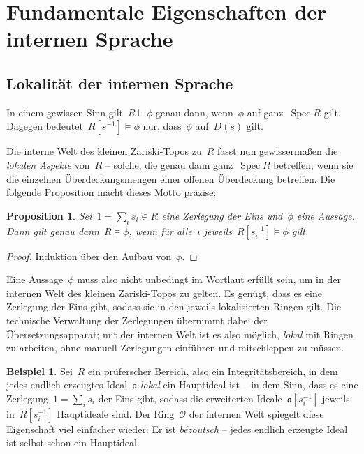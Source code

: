 \documentclass[a4paper,ngerman,12pt]{scrartcl}
\theoremstyle{definition}
\newtheorem{bsp}[defn]{Beispiel}
\theoremstyle{plain}
\newtheorem{prop}[defn]{Proposition}
\theoremstyle{remark}
\renewcommand{\aa}{\mathfrak{a}}
\renewcommand{\O}{\mathcal{O}}
\DeclareMathOperator{\Spec}{Spec}
\renewcommand{\_}{\mathpunct{.}\,}
\newcommand{\?}{\,{:}\,}
\begin{document}
\section{Fundamentale Eigenschaften der internen Sprache}

\subsection{Lokalität der internen Sprache}

In einem gewissen Sinn gilt~$R \models \phi$ genau dann, wenn~$\phi$ auf ganz~$\Spec R$
gilt. Dagegen bedeutet~$R[s^{-1}] \models \phi$ nur, dass~$\phi$ auf~$D(s)$
gilt.

Die interne Welt des kleinen Zariski-Topos zu~$R$ fasst nun gewissermaßen die
\emph{lokalen Aspekte} von~$R$ -- solche, die genau dann ganz~$\Spec R$
betreffen, wenn sie die einzelnen Überdeckungsmengen einer offenen
Überdeckung betreffen. Die folgende Proposition macht dieses Motto präzise:
\begin{prop}Sei~$1 = \sum_i s_i \in R$ eine Zerlegung der Eins und~$\phi$ eine
Aussage. Dann gilt genau dann~$R \models \phi$, wenn für alle~$i$
jeweils~$R[s_i^{-1}] \models \phi$ gilt.\end{prop}
\begin{proof}Induktion über den Aufbau von~$\phi$.\end{proof}

Eine Aussage~$\phi$ muss also nicht unbedingt im Wortlaut erfüllt sein, um in
der internen Welt des kleinen Zariski-Topos zu gelten. Es genügt, dass es
eine Zerlegung der Eins gibt, sodass sie in den jeweils lokalisierten Ringen gilt.
Die technische Verwaltung der Zerlegungen übernimmt dabei der
Übersetzungsapparat; mit der internen Welt ist es also möglich, \emph{lokal}
mit Ringen zu arbeiten, ohne manuell Zerlegungen einführen und mitschleppen
zu müssen.

\begin{bsp}\label{lokal-hauptideale}%
Sei~$R$ ein prüferscher Bereich, also ein Integritätsbereich, in dem jedes endlich erzeugtes
Ideal~$\aa$ \emph{lokal} ein
Hauptideal ist -- in dem Sinn, dass es eine Zerlegung~$1 = \sum_i s_i$ der Eins
gibt, sodass die erweiterten Ideale~$\aa[s_i^{-1}]$ jeweils in~$R[s_i^{-1}]$
Hauptideale sind. Der Ring~$\O$ der internen Welt spiegelt diese Eigenschaft
viel einfacher wieder: Er ist \emph{bézoutsch} -- jedes endlich
erzeugte Ideal ist selbst schon ein Hauptideal.\end{bsp}
\end{document}
